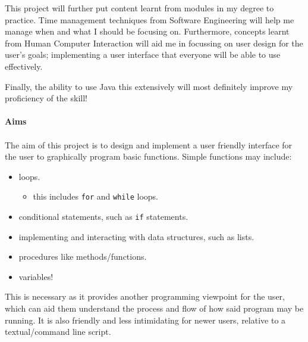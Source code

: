 \documentclass[a4paper, 12pt]{article}
\begin{document}
            This project will further put content learnt from modules in my degree to                practice. Time management techniques from Software Engineering will help me
            manage when and what I should be focusing on. Furthermore, concepts learnt
            from Human Computer Interaction will aid me in focussing on user design for
            the user's goals; implementing a user interface that everyone will be able to
            use effectively.
        
            Finally, the ability to use Java this extensively will most definitely improve
            my proficiency of the skill! \\\\
            \textbf{Aims} \\\\
            The aim of this project is to design and implement a user friendly interface for
            the user to graphically program basic functions. Simple functions may include:
            \begin{itemize}
                \item loops.
                \begin{itemize}
                    \item this includes \texttt{for} and \texttt{while} loops.
                \end{itemize}
                \item conditional statements, such as \texttt{if} statements.
                \item implementing and interacting with data structures, such as lists.
                \item procedures like methods/functions.
                \item variables!
            \end{itemize}
            
            This is necessary as it provides another programming viewpoint for the user,
            which can aid them understand the process and flow of how said program may be running.
            It is also friendly and less intimidating for newer users, relative to a textual/command
            line script.
                
\end{document}
